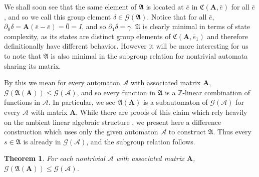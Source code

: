 \documentclass[runningheads]{llncs}
\newcommand{\A}{\mathcal{A}}
\newcommand{\G}{\mathcal{G}}
\renewcommand{\P}{\mathfrak{A}}
\newcommand{\C}{\mathfrak{C}(\Am,\e)}
\newcommand{\Z}{\mathbb{Z}}
\newcommand{\2}{\textbf{2}}
\newcommand{\Am}{\textbf{A}}
\newcommand{\del}{\partial}
\newcommand{\e}{\bar{e}}
\newtheorem{thm}{Theorem}
\begin{document}
We shall soon see that the same element of $\P$ is located at $\e$ in 
$\C$ for all $\e$, and so we call this group element $\delta \in \G(\P)$. 
Notice that for all $\e$, $\del_0 \delta = \Am(\e - \e) = \bar{0} = I$, and so
$\del_1 \delta = \gamma$. $\P$ is clearly minimal in terms of state complexity, 
as its states are distinct group elements of $\mathfrak{C}(\Am, \e_1)$ and 
therefore definitionally have different behavior. However it will be more 
interesting for us to note that $\P$ is also minimal in the subgroup relation 
for nontrivial automata sharing its matrix. 

By this we mean for every automaton $\A$ with associated matrix $\Am$, 
$\G(\P(\Am)) \leq \G(\A)$, and so every function in $\P$ is
a $\Z$-linear combination of functions in $\A$. In particular, we see
$\P(\Am)$ is a subautomaton of $\G(\A)$ for every $\A$ with matrix $\Am$.
While there are proofs of this claim which rely heavily on the
ambient linear algebraic structure \cite{Okano15:thesis}, 
we present here a difference construction which uses only the given 
automaton $\A$ to construct $\P$. Thus every $s \in \P$ is already in
$\G(\A)$, and the subgroup relation follows.

\begin{thm}
  For each nontrivial $\A$ with associated matrix $\Am$,\\
  $\G(\P(\Am)) \leq \G(\A)$.
\end{thm}
\end{document}
